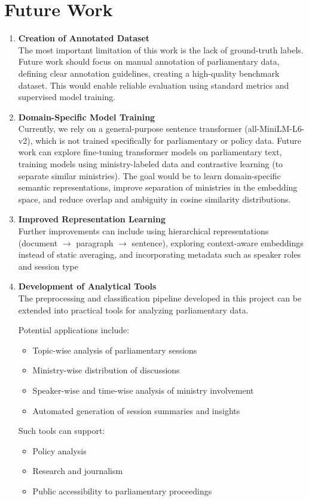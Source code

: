 \documentclass{report}
\begin{document}
\section{Future Work}
\begin{enumerate}
    \item \textbf{Creation of Annotated Dataset}\\
        The most important limitation of this work is the lack of ground-truth labels. Future work should focus on manual annotation of parliamentary data, defining clear annotation guidelines, creating a high-quality benchmark dataset. This would enable reliable evaluation using standard metrics and supervised model training.
    \item \textbf{Domain-Specific Model Training}\\
        Currently, we rely on a general-purpose sentence transformer (all-MiniLM-L6-v2), which is not trained specifically for parliamentary or policy data. Future work can explore fine-tuning transformer models on parliamentary text, training models using ministry-labeled data and contrastive learning (to separate similar ministries). The goal would be to learn domain-specific semantic representations, improve separation of ministries in the embedding space, and reduce overlap and ambiguity in cosine similarity distributions.
    \item \textbf{Improved Representation Learning}\\
        Further improvements can include using hierarchical representations (document $\rightarrow$ paragraph $\rightarrow$ sentence), exploring context-aware embeddings instead of static averaging, and incorporating metadata such as speaker roles and session type
    \item \textbf{Development of Analytical Tools}\\
        The preprocessing and classification pipeline developed in this project can be extended into practical tools for analyzing parliamentary data.
        
        Potential applications include:
        \begin{itemize}
            \item Topic-wise analysis of parliamentary sessions
            \item Ministry-wise distribution of discussions
            \item Speaker-wise and time-wise analysis of ministry involvement
            \item Automated generation of session summaries and insights
        \end{itemize}
        
        Such tools can support:
        \begin{itemize}
            \item Policy analysis
            \item Research and journalism
            \item Public accessibility to parliamentary proceedings
        \end{itemize}

\end{enumerate}
\end{document}
